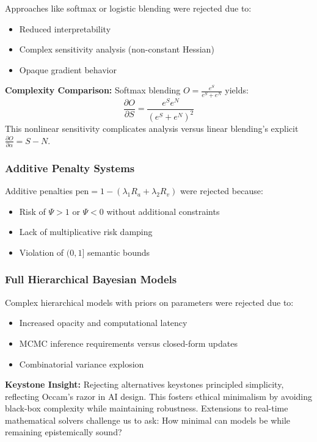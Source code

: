 \documentclass[12pt,a4paper]{article}
\theoremstyle{definition}
\theoremstyle{remark}
\begin{document}
Approaches like softmax or logistic blending were rejected due to:
\begin{itemize}
    \item Reduced interpretability
    \item Complex sensitivity analysis (non-constant Hessian)
    \item Opaque gradient behavior
\end{itemize}

\begin{proofbox}
\textbf{Complexity Comparison:} Softmax blending $O = \frac{e^S}{e^S + e^N}$ yields:
$$\frac{\partial O}{\partial S} = \frac{e^S e^N}{(e^S + e^N)^2}$$
This nonlinear sensitivity complicates analysis versus linear blending's explicit $\frac{\partial O}{\partial \alpha} = S - N$.
\end{proofbox}

\subsubsection{Additive Penalty Systems}

Additive penalties $\text{pen} = 1 - (\lambda_1 R_a + \lambda_2 R_v)$ were rejected because:
\begin{itemize}
    \item Risk of $\Psi > 1$ or $\Psi < 0$ without additional constraints
    \item Lack of multiplicative risk damping
    \item Violation of $(0,1]$ semantic bounds
\end{itemize}

\subsubsection{Full Hierarchical Bayesian Models}

Complex hierarchical models with priors on parameters were rejected due to:
\begin{itemize}
    \item Increased opacity and computational latency
    \item MCMC inference requirements versus closed-form updates
    \item Combinatorial variance explosion
\end{itemize}

\begin{reflectionbox}
\textbf{Keystone Insight:} Rejecting alternatives keystones principled simplicity, reflecting Occam's razor in AI design. This fosters ethical minimalism by avoiding black-box complexity while maintaining robustness. Extensions to real-time mathematical solvers challenge us to ask: How minimal can models be while remaining epistemically sound?
\end{reflectionbox}
\end{document}
